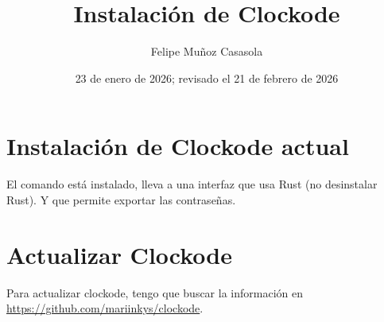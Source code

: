 \documentclass{article}
\title{Instalación de Clockode}
\author{Felipe Muñoz Casasola}
\date{23 de enero de 2026; revisado el 21 de febrero de 2026}
\begin{document}
    \maketitle
    \clearpage
    \section{Instalación de Clockode actual}
    El comando está instalado, lleva a una interfaz que usa Rust (no desinstalar
    Rust). Y que permite exportar las contraseñas.

    \section{Actualizar Clockode}
    Para actualizar clockode, tengo que buscar la información en
    \href{https://github.com/mariinkys/clockode}
    {https://github.com/mariinkys/clockode}.
\end{document}
